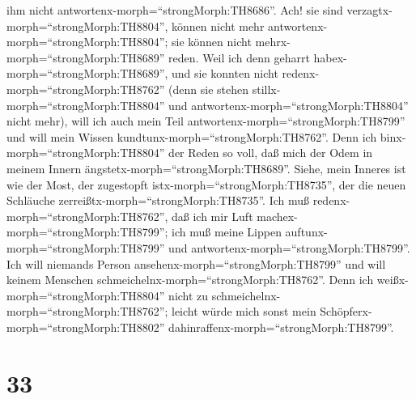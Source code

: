 ihm nicht antwortenx-morph=``strongMorph:TH8686''.  Ach!
sie sind verzagtx-morph=``strongMorph:TH8804'', können nicht mehr
antwortenx-morph=``strongMorph:TH8804''; sie können nicht
mehrx-morph=``strongMorph:TH8689'' reden.  Weil ich denn
geharrt habex-morph=``strongMorph:TH8689'', und sie konnten nicht
redenx-morph=``strongMorph:TH8762'' (denn sie stehen
stillx-morph=``strongMorph:TH8804'' und
antwortenx-morph=``strongMorph:TH8804'' nicht mehr),  will
ich auch mein Teil antwortenx-morph=``strongMorph:TH8799'' und will mein
Wissen kundtunx-morph=``strongMorph:TH8762''.  Denn ich
binx-morph=``strongMorph:TH8804'' der Reden so voll, daß mich der Odem
in meinem Innern ängstetx-morph=``strongMorph:TH8689''. 
Siehe, mein Inneres ist wie der Most, der zugestopft
istx-morph=``strongMorph:TH8735'', der die neuen Schläuche
zerreißtx-morph=``strongMorph:TH8735''.  Ich muß
redenx-morph=``strongMorph:TH8762'', daß ich mir Luft
machex-morph=``strongMorph:TH8799''; ich muß meine Lippen
auftunx-morph=``strongMorph:TH8799'' und
antwortenx-morph=``strongMorph:TH8799''.  Ich will niemands
Person ansehenx-morph=``strongMorph:TH8799'' und will keinem Menschen
schmeichelnx-morph=``strongMorph:TH8762''.  Denn ich
weißx-morph=``strongMorph:TH8804'' nicht zu
schmeichelnx-morph=``strongMorph:TH8762''; leicht würde mich sonst mein
Schöpferx-morph=``strongMorph:TH8802''
dahinraffenx-morph=``strongMorph:TH8799''.

\hypertarget{section-32}{%
\section{33}\label{section-32}}


